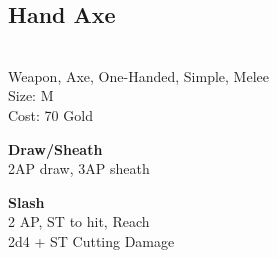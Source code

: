 \subsection{Hand Axe}\label{weapon:handAxe}\\
Weapon, Axe, One-Handed, Simple, Melee\\
Size: M\\
Cost: 70 Gold

\textbf{Draw/Sheath}\\
2AP draw, 3AP sheath

\textbf{Slash}\\
2 AP, ST to hit,  Reach\\
2d4 + \texttimes ST Cutting Damage

